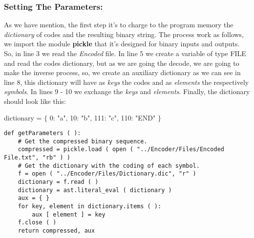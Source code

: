 \subsubsection{Setting The Parameters:}

As we have mention, the first step it's to charge to the program memory the {\itshape dictionary} of codes and the resulting binary string. The process work as follows, we import the module {\bfseries pickle} that it's designed for binary inputs and outputs. So, in line 3 we read the {\itshape Encoded} file. In line 5 we create a variable of type FILE and read the codes dictionary, but as we are going the decode, we are going to make the inverse process, so, we create an auxiliary dictionary as we can see in line 8, this dictionary will have as {\itshape keys} the codes and as {\itshape elements} the respectively {\itshape symbols}. In lines 9 - 10 we exchange the {\itshape keys} and {\itshape elements}. Finally, the dictionary should look like this: \hfill \break

\begin{center}
dictionary = $\lbrace$ 0: "a", 10: "b", 111: "c", 110: "END" $\rbrace$
\end{center} \hfill \break

\begin{lstlisting}
def getParameters ( ):
    # Get the compressed binary sequence.
    compressed = pickle.load ( open ( "../Encoder/Files/Encoded File.txt", "rb" ) )
    # Get the dictionary with the coding of each symbol.
    f = open ( "../Encoder/Files/Dictionary.dic", "r" )
    dictionary = f.read ( )
    dictionary = ast.literal_eval ( dictionary )
    aux = { }
    for key, element in dictionary.items ( ):
        aux [ element ] = key
    f.close ( )
    return compressed, aux
\end{lstlisting}

\pagebreak
